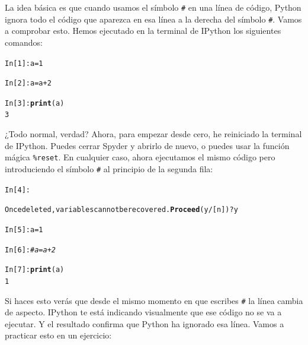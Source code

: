 \documentclass[10pt,a4paper]{article}\usepackage[]{graphicx}\usepackage[]{color}
\makeatletter
\newcommand{\hlnum}[1]{\textcolor[rgb]{0.686,0.059,0.569}{#1}}%
\newcommand{\hlcom}[1]{\textcolor[rgb]{0.678,0.584,0.686}{\textit{#1}}}%
\newcommand{\hlopt}[1]{\textcolor[rgb]{0,0,0}{#1}}%
\newcommand{\hlstd}[1]{\textcolor[rgb]{0.345,0.345,0.345}{#1}}%
\newcommand{\hlkwb}[1]{\textcolor[rgb]{0.69,0.353,0.396}{#1}}%
\newcommand{\hlkwd}[1]{\textcolor[rgb]{0.737,0.353,0.396}{\textbf{#1}}}%
\newenvironment{kframe}{%
 \def\at@end@of@kframe{}%
 \ifinner\ifhmode%
  \def\at@end@of@kframe{\end{minipage}}%
  \begin{minipage}{\columnwidth}%
 \fi\fi%
 \def\FrameCommand##1{\hskip\@totalleftmargin \hskip-\fboxsep
 \colorbox{shadecolor}{##1}\hskip-\fboxsep
     \hskip-\linewidth \hskip-\@totalleftmargin \hskip\columnwidth}%
 \MakeFramed {\advance\hsize-\width
   \@totalleftmargin\z@ \linewidth\hsize
   \@setminipage}}%
 {\par\unskip\endMakeFramed%
 \at@end@of@kframe}
\newenvironment{knitrout}{}{} %
\makeatother
\begin{document}
La idea básica es que cuando usamos el símbolo \verb&#& en una línea de código, Python ignora todo el código que aparezca en esa línea a la derecha del símbolo \verb&#&. Vamos a comprobar esto. Hemos ejecutado en la terminal de IPython los siguientes comandos:
\begin{knitrout}
\color{fgcolor}\begin{kframe}
\begin{alltt}
\hlstd{In [}\hlnum{1}\hlstd{]}\hlopt{:} \hlstd{a} \hlkwb{=} \hlnum{1}

\hlstd{In [}\hlnum{2}\hlstd{]}\hlopt{:} \hlstd{a} \hlkwb{=} \hlstd{a} \hlopt{+} \hlnum{2}

\hlstd{In [}\hlnum{3}\hlstd{]}\hlopt{:} \hlkwd{print}\hlstd{(a)}
\hlnum{3}
\end{alltt}
\end{kframe}
\end{knitrout}
¿Todo normal, verdad? Ahora, para empezar desde cero, he reiniciado la terminal de IPython. Puedes cerrar Spyder y abrirlo de nuevo, o puedes usar la función mágica \verb#%reset#.
En cualquier caso, ahora ejecutamos el mismo código pero introduciendo el símbolo \verb&#& al principio de la segunda fila:
\begin{knitrout}
\color{fgcolor}\begin{kframe}
\begin{alltt}
In [4]: %

Once deleted, variables cannot be recovered. \hlkwd{Proceed} (y/[n])? y

In [5]: a = 1

In [6]: \hlcom{# a = a + 2}

In [7]: \hlkwd{print}(a)
1
\end{alltt}
\end{kframe}
\end{knitrout}
Si haces esto verás que desde el mismo momento en que escribes \verb&#& la línea cambia de aspecto. IPython te está indicando visualmente que ese código no se va a ejecutar. Y el resultado confirma que Python ha ignorado esa línea.  Vamos a practicar esto en un ejercicio:
\end{document}
